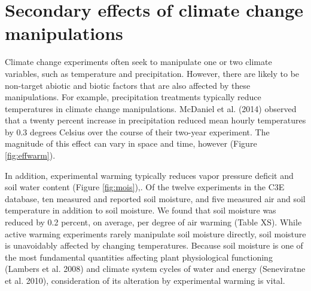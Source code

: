 \documentclass{article}
\begin{document}
\section* {Secondary effects of climate change manipulations}
Climate change experiments often seek to manipulate one or two climate variables, such as temperature and precipitation. However, there are likely to be non-target abiotic and biotic factors that are also affected by these manipulations. For example, precipitation treatments typically reduce temperatures in climate change manipulations\citep{sherry2007,rollinson2012,mcdaniel2014}. McDaniel et al. (2014) observed that a twenty percent increase in precipitation reduced mean hourly temperatures by 0.3 degrees Celsius over the course of their two-year experiment. The magnitude of this effect can vary in space and time, however (Figure \ref{fig:effwarm}). 
\par In addition, experimental warming typically reduces vapor pressure deficit and soil water content (Figure \ref{fig:mois}),\citep[e.g.][]{sherry2007,morin2010,templer2016}. Of the twelve experiments in the C3E database, ten measured and reported soil moisture, and five measured air and soil temperature in addition to soil moisture. We found that soil moisture was reduced by 0.2 percent, on average, per degree of air warming (Table XS). While active warming experiments rarely manipulate soil moisture directly, soil moisture is unavoidably affected by changing temperatures. Because soil moisture is one of the most fundamental quantities affecting plant physiological functioning (Lambers et al. 2008) and climate system cycles of water and energy (Seneviratne et al. 2010), consideration of its alteration by experimental warming is vital. 
\end{document}
